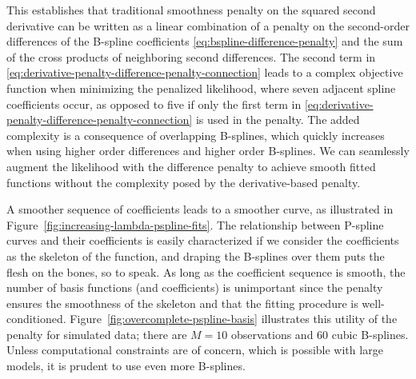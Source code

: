 This establishes that traditional smoothness penalty on the squared second derivative can be written as a linear combination of a penalty on the second-order differences of the B-spline coefficients \ref{eq:bspline-difference-penalty} and the sum of the cross products of neighboring second differences. The second term in \ref{eq:derivative-penalty-difference-penalty-connection} leads to a complex objective function when minimizing the penalized likelihood, where seven adjacent spline coefficients occur, as opposed to five if only the first term in \ref{eq:derivative-penalty-difference-penalty-connection} is used in the penalty. The added complexity is a consequence of overlapping B-splines, which quickly increases when using higher order differences and higher order B-splines. We can seamlessly augment the likelihood with the difference penalty to achieve smooth fitted functions without the complexity posed by the derivative-based penalty.

\bigskip

A smoother sequence of coefficients leads to a smoother curve, as illustrated in Figure~\ref{fig:increasing-lambda-pspline-fits}.  The relationship between P-spline curves and their coefficients is easily characterized if we consider the coefficients as the skeleton of the function, and draping the B-splines over them puts the flesh on the bones, so to speak. As long as the coefficient sequence is smooth, the number of basis functions (and coefficients) is unimportant since the penalty ensures the smoothness of the skeleton and that the fitting procedure is well-conditioned.  Figure~\ref{fig:overcomplete-pspline-basis} illustrates this utility of the penalty for simulated data; there are $M=10$ observations and $60$ cubic B-splines. Unless computational constraints are of concern, which is possible with large models, it is prudent to use even more B-splines.  

